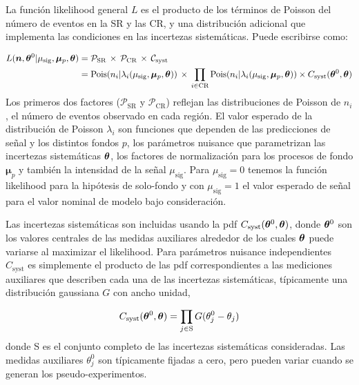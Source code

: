 La función likelihood general $L$ es el producto de los términos de Poisson del número
de eventos en la SR y las CR, y una distribución adicional que implementa las
condiciones en las incertezas sistemáticas. Puede escribirse como:

\begin{align}
  L(\bm{n}, \bm{\theta}^0| \mu_\text{sig}, \bm{\mu}_p, \bm{\theta}) &= \mathcal{P}_\text{SR} \, \times \, \mathcal{P}_\text{CR} \, \times \, \mathcal{C}_\text{syst} \nonumber \\
  &= \operatorname{Pois}(n_i|\lambda_i(\mu_\text{sig}, \bm{\mu}_p, \bm{\theta})) \, \times \, \prod_{i \in \text{CR}} \operatorname{Pois}(n_i|\lambda_i(\mu_\text{sig}, \bm{\mu}_p, \bm{\theta})) \times C_\text{syst} (\bm{\theta}^0, \bm{\theta})
\end{align}
%
Los primeros dos factores ($\mathcal{P}_\text{SR}$ y $\mathcal{P}_\text{CR}$)
reflejan las distribuciones de Poisson de $n_i$, el número de
eventos observado en cada región. El valor esperado de la distribución de Poisson
$\lambda_i$ son funciones que dependen de las predicciones de señal y los distintos fondos $p$, los
parámetros nuisance que parametrizan las incertezas sistemáticas $\bm{\theta}$, los factores
de normalización para los procesos de fondo $\bm{\mu}_p$ y también la intensidad de la
señal $\mu_\text{sig}$. Para $\mu_\text{sig} = 0$ tenemos la función likelihood para
la hipótesis de solo-fondo y con $\mu_\text{sig} = 1$ el valor esperado de señal para el
valor nominal de modelo bajo consideración.

Las incertezas sistemáticas son incluidas usando la pdf $C_\text{syst}(\bm{\theta}^0, \bm{\theta})$,
donde $\bm{\theta}^0$ son los valores centrales de las medidas auxiliares alrededor de los
cuales $\bm{\theta}$ puede variarse al maximizar el likelihood. %
Para parámetros nuisance independientes $C_\text{syst}$ es simplemente el producto
de las pdf correspondientes a las mediciones auxiliares que describen cada una de las
incertezas sistemáticas, típicamente una distribución gaussiana $G$ con ancho unidad,

\begin{equation}
  C_\text{syst} (\bm{\theta}^0, \bm{\theta}) = \prod_{j \in \text{S}} G(\theta_j^0 - \theta_j)
\end{equation}
%
donde S es el conjunto completo de las incertezas sistemáticas consideradas.
Las medidas auxiliares $\theta^0_j$ son típicamente fijadas a cero, pero pueden
variar cuando se generan los pseudo-experimentos.


